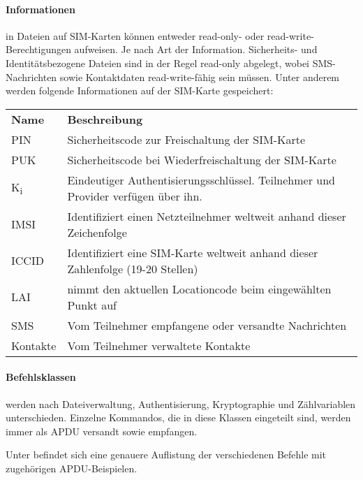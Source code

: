 \paragraph{Informationen} in Dateien auf SIM-Karten können entweder read-only- oder read-write-
Berechtigungen aufweisen. Je nach Art der Information. Sicherheits- und Identitätsbezogene
Dateien sind in der Regel read-only abgelegt, wobei SMS-Nachrichten sowie Kontaktdaten
read-write-fähig sein müssen. Unter anderem werden folgende Informationen auf der SIM-Karte gespeichert:

    \begin{tabularx}{\textwidth}{|l|X|}
    \hline
      \textbf{Name} & \textbf{Beschreibung} \\
      \ac{PIN} & Sicherheitscode zur Freischaltung der SIM-Karte \\
    \hline
    \hline
          \ac{PUK} & Sicherheitscode bei Wiederfreischaltung der SIM-Karte \\
    \hline
    \hline
      K\textsubscript{i} & Eindeutiger Authentisierungsschlüssel. Teilnehmer und Provider verfügen über ihn. \\
    \hline
    \hline
      \ac{IMSI} & Identifiziert einen Netzteilnehmer weltweit anhand dieser Zeichenfolge \\
    \hline
    \hline
      \ac{ICCID} & Identifiziert eine SIM-Karte weltweit anhand dieser Zahlenfolge (19-20 Stellen) \\
    \hline
    \hline
      \ac{LAI} & nimmt den aktuellen Locationcode beim eingewählten Punkt auf \\ 
    \hline
    \hline
      \ac{SMS} & Vom Teilnehmer empfangene oder versandte Nachrichten \\
    \hline
    \hline
      Kontakte & Vom Teilnehmer verwaltete Kontakte \\
    \hline
    \end{tabularx}


\paragraph{Befehlsklassen} werden nach Dateiverwaltung, Authentisierung, Kryptographie
und Zählvariablen unterschieden\cite{spitz11}. Einzelne Kommandos, die in diese
Klassen eingeteilt sind, werden immer als \ac{APDU} versandt sowie empfangen.

Unter  befindet sich eine genauere
Auflistung der verschiedenen Befehle mit zugehörigen \ac{APDU}-Beispielen.

